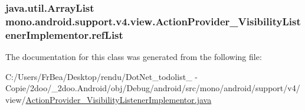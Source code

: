 \hypertarget{classmono_1_1android_1_1support_1_1v4_1_1view_1_1_action_provider___visibility_listener_implementor_c59b087212168bc4fdc6427b368abd04}{
\subsubsection[{refList}]{\setlength{\rightskip}{0pt plus 5cm}java.util.ArrayList {\bf mono.android.support.v4.view.ActionProvider\_\-VisibilityListenerImplementor.refList}}}
\label{classmono_1_1android_1_1support_1_1v4_1_1view_1_1_action_provider___visibility_listener_implementor_c59b087212168bc4fdc6427b368abd04}




The documentation for this class was generated from the following file:\begin{CompactItemize}
\item 
C:/Users/FrBea/Desktop/rendu/DotNet\_\-todolist\_ - Copie/2doo/\_\-2doo.Android/obj/Debug/android/src/mono/android/support/v4/view/\hyperlink{_action_provider___visibility_listener_implementor_8java}{ActionProvider\_\-VisibilityListenerImplementor.java}\end{CompactItemize}
